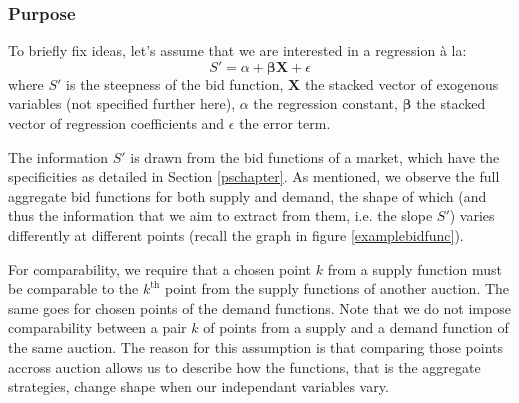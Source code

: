 %
%




\subsubsection{Purpose}
\label{newapproach}
\label{purposepointselec}
To briefly fix ideas, let's assume that we are interested in a regression \`{a} la: 
$$ S' = \alpha + \boldsymbol{\beta  X} + \epsilon$$
where $S'$ is the steepness of the bid function, $\boldsymbol{X}$ the stacked vector of exogenous variables (not specified further here), $\alpha$ the regression constant, $\boldsymbol{\beta}$ the stacked vector of regression coefficients and $\epsilon$ the error term. 

The information $S'$ is drawn from the bid functions of a %
market, which have the specificities as detailed in Section \ref{pschapter}. As mentioned, we observe the full aggregate bid functions for both supply and demand, 
the shape of which 
(and thus the information that we aim to extract from them, i.e. the slope $S'$) varies differently at different points (recall the graph in figure \ref{examplebidfunc}).    

For comparability, we require that a chosen point $k$ from a supply function must be comparable to the $k^\text{th}$ point from the supply functions of another auction. The same goes for chosen points of the demand functions. Note that we do not impose comparability between a pair $k$ of points from a supply and a demand function of the same auction. The reason for this assumption is that comparing those points accross auction allows us to describe how the functions, that is the aggregate strategies, change shape when our independant variables vary. 

